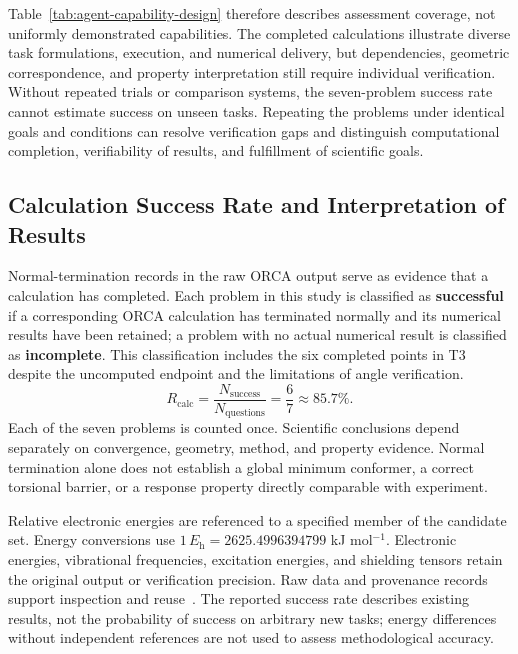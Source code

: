 \documentclass[a4paper,11pt]{article}
\newcommand{\Eh}{E_{\mathrm h}}
\begin{document}
Table~\ref{tab:agent-capability-design} therefore describes assessment coverage, not uniformly demonstrated capabilities.
The completed calculations illustrate diverse task formulations, execution, and numerical delivery,
but dependencies, geometric correspondence, and property interpretation still require individual verification.
Without repeated trials or comparison systems, the seven-problem success rate cannot estimate success on unseen tasks.
Repeating the problems under identical goals and conditions can resolve verification gaps
and distinguish computational completion, verifiability of results, and fulfillment of scientific goals.

\subsection{Calculation Success Rate and Interpretation of Results}
Normal-termination records in the raw ORCA output serve as evidence that a calculation has completed.
Each problem in this study is classified as \textbf{successful} if a corresponding ORCA calculation has terminated normally
and its numerical results have been retained; a problem with no actual numerical result is classified as \textbf{incomplete}.
This classification includes the six completed points in T3 despite the uncomputed endpoint and the limitations of angle verification.
\begin{equation}
  R_{\mathrm{calc}}=\frac{N_{\mathrm{success}}}{N_{\mathrm{questions}}}
  =\frac{6}{7}\approx85.7\%.
  \label{eq:success-rate}
\end{equation}
Each of the seven problems is counted once.
Scientific conclusions depend separately on convergence, geometry, method, and property evidence.
Normal termination alone does not establish a global minimum conformer, a correct torsional barrier,
or a response property directly comparable with experiment.

Relative electronic energies are referenced to a specified member of the candidate set.
Energy conversions use $1\,\Eh=2625.4996394799$ kJ mol$^{-1}$.
Electronic energies, vibrational frequencies, excitation energies, and shielding tensors retain the original output or verification precision.
Raw data and provenance records support inspection and reuse~\cite{fair}.
The reported success rate describes existing results, not the probability of success on arbitrary new tasks;
energy differences without independent references are not used to assess methodological accuracy.
\end{document}
